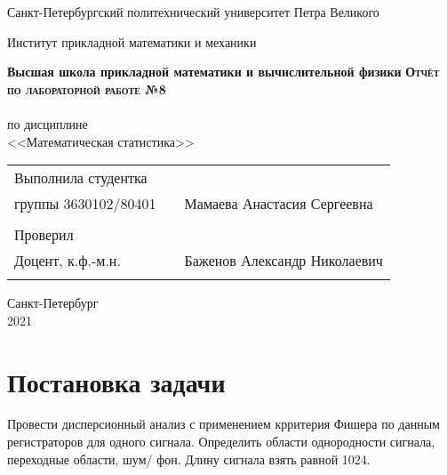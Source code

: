\documentclass{article}
\begin{document}
\begin{titlepage}
  \begin{center}
    \large
    Санкт-Петербургский политехнический университет Петра Великого
    
    Институт прикладной математики и механики
    
    \textbf{Высшая школа прикладной математики и вычислительной физики}
    \vfill
    \textsc{\textbf{\Large{Отчёт по лабораторной работе №8}}}\\[5mm]
    \\ по дисциплине
    \\ <<Математическая статистика>>\\
\end{center}

\vfill

\begin{tabular}{l p{} l}
Выполнила студентка \\группы 3630102/80401 && Мамаева Анастасия Сергеевна \\
\\
Проверил\\Доцент, к.ф.-м.н.& \hspace{0pt} &   Баженов Александр Николаевич \\\\
\end{tabular}

\hfill \break
\hfill \break
\begin{center} Санкт-Петербург \\2021 \end{center}
\thispagestyle{empty}
\end{titlepage}
\newpage
\newpage
\begin{center}
    \setcounter{page}{2}
    \tableofcontents
\end{center}
\newpage
\begin{center}
    \setcounter{page}{3}
    \listoffigures
\end{center}

\newpage

\section {Постановка задачи}
\noindent Провести дисперсионный анализ с применением крритерия Фишера по данным регистраторов для одного сигнала. Определить области однородности сигнала, переходные области, шум/ фон. Длину сигнала взять равной 1024.
\end{document}
